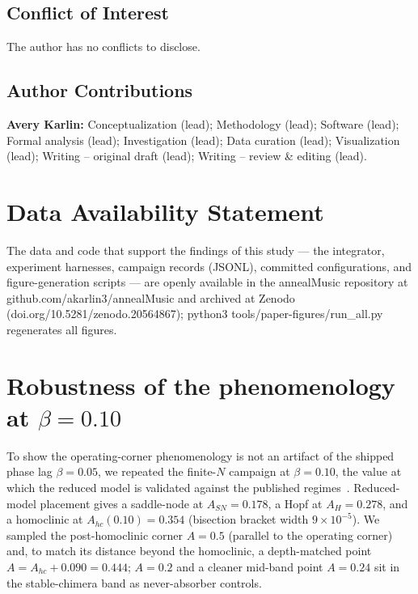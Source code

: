 \documentclass[aip,preprint,amsmath,amssymb]{revtex4-2}
\begin{document}
\subsection*{Conflict of Interest}
The author has no conflicts to disclose.

\subsection*{Author Contributions}
\textbf{Avery Karlin:} Conceptualization (lead); Methodology (lead); Software
(lead); Formal analysis (lead); Investigation (lead); Data curation (lead);
Visualization (lead); Writing -- original draft (lead); Writing -- review \&
editing (lead).

\section*{Data Availability Statement}
The data and code that support the findings of this study --- the integrator,
experiment harnesses, campaign records (JSONL), committed configurations, and
figure-generation scripts --- are openly available in the annealMusic repository at
github.com/akarlin3/annealMusic and archived at Zenodo
(doi.org/10.5281/zenodo.20564867); python3 tools/paper-figures/run\_all.py
regenerates all figures.

\appendix

\section{Robustness of the phenomenology at $\beta = 0.10$}\label{app:beta}

To show the operating-corner phenomenology is not an artifact of the shipped phase
lag $\beta = 0.05$, we repeated the finite-$N$ campaign at $\beta = 0.10$, the value
at which the reduced model is validated against the published
regimes~\cite{abrams2008}. Reduced-model placement gives a saddle-node at
$A_{SN} = 0.178$, a Hopf at $A_H = 0.278$, and a homoclinic at
$A_{hc}(0.10) = 0.354$ (bisection bracket width $9\times10^{-5}$). We sampled the
post-homoclinic corner $A = 0.5$ (parallel to the operating corner) and, to match its
distance beyond the homoclinic, a depth-matched point
$A = A_{hc} + 0.090 = 0.444$; $A = 0.2$ and a cleaner mid-band point $A = 0.24$ sit
in the stable-chimera band as never-absorber controls.
\end{document}
